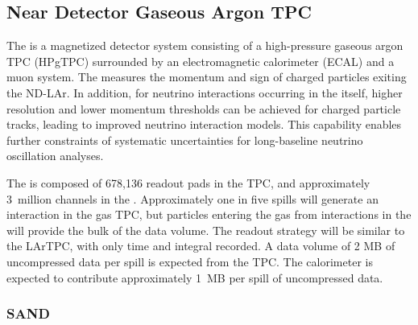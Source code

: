 \documentclass[../main-v1.tex]{subfiles}
\begin{document}

\subsection{Near Detector Gaseous Argon TPC}
\label{sec:comp-dataestimates-mpd}

The  is a magnetized detector system consisting of a high-pressure gaseous argon TPC  (HPgTPC) surrounded by an electromagnetic calorimeter (ECAL) and a muon system. The  measures the momentum and sign of charged particles exiting the ND-LAr. In addition, for neutrino interactions occurring in the  itself, higher resolution and lower momentum thresholds can be achieved for charged particle tracks, leading to improved neutrino interaction models. This capability enables further constraints of systematic uncertainties for long-baseline neutrino  oscillation analyses.

The  is composed of 678,136 readout pads in the TPC, and approximately 3~million channels in the .  Approximately one in five spills will generate an interaction in the gas TPC, but particles entering the gas from interactions in the  will provide the bulk of the data volume.  The readout strategy will be similar to the LArTPC, with only time and integral recorded. A  data volume of 2 MB of uncompressed data per spill is expected from the TPC.  The calorimeter is expected to contribute approximately 1~MB per spill of uncompressed data.




\subsubsection{SAND }
\label{sec:comp-dataestimates-sand}
\end{document}
